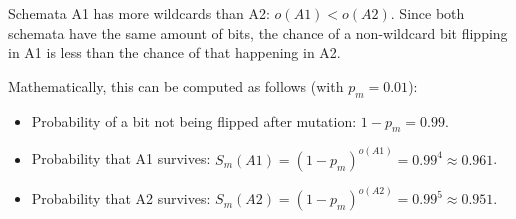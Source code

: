 \item

Schemata A1 has more wildcards than A2: $o(A1) < o(A2)$. Since both schemata have the same amount of bits, the chance of a non-wildcard bit flipping in A1 is less than the chance of that happening in A2.

Mathematically, this can be computed as follows (with $p_m=0.01$):
\begin{itemize}
 \item Probability of a bit not being flipped after mutation: $1-p_m=0.99$.
 \item Probability that A1 survives: $S_m(A1)=(1-p_m)^{o(A1)}=0.99^4\approx0.961$.
 \item Probability that A2 survives: $S_m(A2)=(1-p_m)^{o(A2)}=0.99^5\approx0.951$.
\end{itemize}
